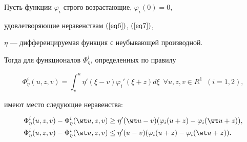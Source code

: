 \begin{lem} \label{L1}


Пусть функции $\varphi_{i}$ строго возрастающие, $\varphi_{i}(0)=0$, 


удовлетворяющие неравенствам $(\ref{eq6})$, $(\ref{eq7})$,


$\eta$ --- дифференцируемая функция с неубывающей производной. 


Тогда для функционалов $\Phi_{\eta}^{i}$, определенных по правилу


$$ 


\Phi_{\eta}^{i}(u,z,v) = \int_{v}^{u}{\eta}'(\xi-v)


{\varphi_{i}}' (\xi+z) d \xi \ \;


\forall u, z, v \in R^{1} \ \; (i=1,2), 


$$


имеют место следующие неравенства:


\begin{align} \label{eq11} 


\Phi_{\eta}^{i}(u,z,v)-\Phi_{\eta}^{i}(\wt u,z,v) &\geq


{\eta}' (\wt u-v)(\varphi_{i}(u+z)- \varphi_{i}(\wt u+z)), \\


%


\label{eq12} 


\Phi_{\eta}^{i}(u,z,v)-\Phi_{\eta}^{i}(\wt u,z,v) &\leq


{\eta}' (u-v)(\varphi_{i}(u+z)- \varphi_{i}(\wt u+z)).


\end{align}


\end{lem}





